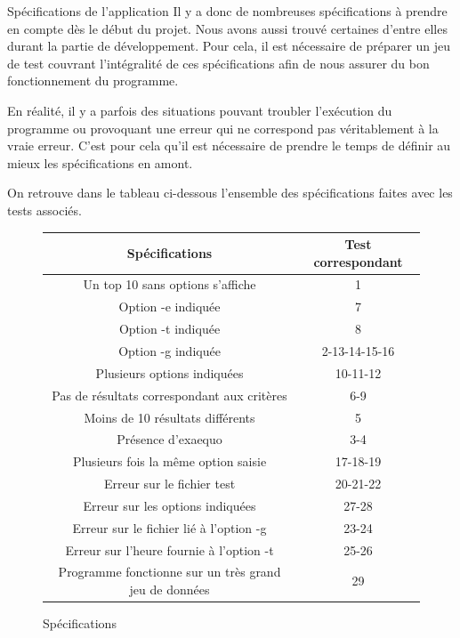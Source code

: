 \documentclass[11pt]{article}
\begin{document}
\begin{section}{Spécifications de l'application}
Il y a donc de nombreuses spécifications à prendre en compte dès le début du projet. Nous avons aussi trouvé certaines d'entre elles durant la partie de développement. Pour cela, il est nécessaire de préparer un jeu de test couvrant l'intégralité de ces spécifications afin de nous assurer du bon fonctionnement du programme.

En réalité, il y a parfois des situations pouvant troubler l'exécution du programme ou provoquant une erreur qui ne correspond pas véritablement à la vraie erreur. C'est pour cela qu'il est nécessaire de prendre le temps de définir au mieux les spécifications en amont.

On retrouve dans le tableau ci-dessous l'ensemble des spécifications faites avec les tests associés.

\begin{figure}
\begin{center}
\begin{tabular}{|c|c|}
\hline
Spécifications & Test correspondant \\
\hline
Un top 10 sans options s'affiche & 1 \\
\hline
Option -e indiquée & 7 \\
\hline
Option -t indiquée & 8 \\
\hline
Option -g indiquée & 2-13-14-15-16 \\
\hline
Plusieurs options indiquées & 10-11-12 \\
\hline
Pas de résultats correspondant aux critères & 6-9 \\
\hline
Moins de 10 résultats différents & 5\\
\hline
Présence d'exaequo & 3-4 \\
\hline
Plusieurs fois la même option saisie & 17-18-19 \\
\hline
Erreur sur le fichier test & 20-21-22 \\
\hline
Erreur sur les options indiquées & 27-28 \\
\hline
Erreur sur le fichier lié à l'option -g & 23-24 \\
\hline
Erreur sur l'heure fournie à l'option -t & 25-26 \\
\hline
Programme fonctionne sur un très grand jeu de données & 29 \\
\hline
\end{tabular}
\end{center}
\caption{Spécifications}
\label{Spécifications}
\end{figure}
\end{section}
\end{document}
